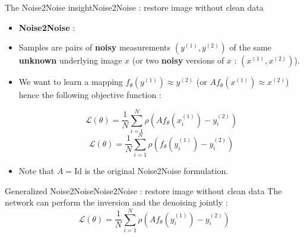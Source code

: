 \documentclass{beamer}
\numberwithin{proposition}{section}
\begin{document}
\begin{frame}{The Noise2Noise insight}{Noise2Noise : restore image without clean data}
    
    \begin{itemize}
        \item \textbf{Noise2Noise} : \cite{lehtinen_noise2noise_2018}
        \item Samples are pairs of \textbf{noisy} measurements $(y^{(1)}, y^{(2)})$ of the same \textbf{unknown} underlying image $x$ (or two \textbf{noisy} versions of $x$ : $(x^{(1)}, x^{(2)})$).

        \item We want to learn a mapping $f_\theta(y^{(1)}) \approx y^{(2)}$ (or $Af_\theta(x^{(1)}) \approx x^{(2)}$) hence the following objective function :
    
    \begin{equation}
        \mathcal{L}(\theta) = \frac{1}{N} \sum_{i=1}^N \rho\left(Af_\theta\left(x_i^{(1)}\right) - y_i^{(2)}\right)
        \label{n2n_loss_im}
    \end{equation}
    \begin{equation}
        \mathcal{L}(\theta) = \frac{1}{N} \sum_{i=1}^N \rho\left(f_\theta\left(y_i^{(1)}\right) - y_i^{(2)}\right)
        \label{n2n_loss_data}
    \end{equation}
    \item Note that $A = \text{Id}$ is the original Noise2Noise formulation.
    \end{itemize}
\end{frame}

\begin{frame}{Generalized Noise2Noise}{Noise2Noise : restore image without clean data}
     The network can perform the inversion and the denoising jointly \cite{xia_training_nodate} :
    \begin{equation}
        \mathcal{L}(\theta) = \frac{1}{N} \sum_{i=1}^N \rho\left(Af_\theta\left(y_i^{(1)}\right) - y_i^{(2)}\right)
        \label{n2n_loss_gen}
    \end{equation}
\end{frame}
\end{document}
